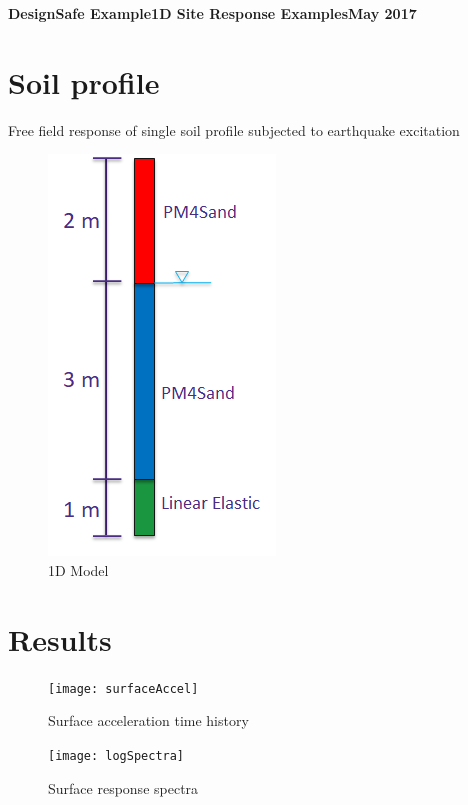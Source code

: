 \documentclass[11pt,fleqn]{article}
\begin{document}
	\begin{center}
	
		\textbf{{DesignSafe Example\hfill{}1D Site Response Examples\hfill{}May 2017}}

	\end{center}
   

\section{Soil profile}

Free field response of single soil profile subjected to earthquake excitation

\begin{figure}[h!]
\centering
\includegraphics[scale=0.7]{schematic}
\caption{1D Model}
\end{figure}

\newpage
\section{Results}

\begin{figure}[h!]
\centering
\texttt{[image: surfaceAccel]}
\caption{Surface acceleration time history}
\end{figure}

\begin{figure}[h!]
\centering
\texttt{[image: logSpectra]}
\caption{Surface response spectra}
\end{figure}
\end{document}

